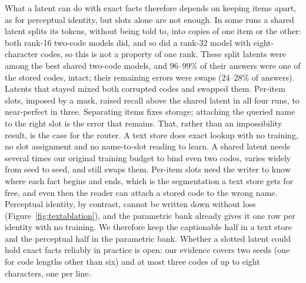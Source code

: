 What a latent can do with exact facts therefore depends on keeping items apart, as for perceptual identity, but slots alone are not enough. In some runs a shared latent splits its tokens, without being told to, into copies of one item or the other: both rank-16 two-code models did, and so did a rank-32 model with eight-character codes, so this is not a property of one rank. These split latents were among the best shared two-code models, and $96$--$99\%$ of their answers were one of the stored codes, intact; their remaining errors were swaps ($24$--$28\%$ of answers). Latents that stayed mixed both corrupted codes and swapped them. Per-item slots, imposed by a mask, raised recall above the shared latent in all four runs, to near-perfect in three. Separating items fixes storage; attaching the queried name to the right slot is the error that remains. That, rather than an impossibility result, is the case for the router. A text store does exact lookup with no training, no slot assignment and no name-to-slot reading to learn. A shared latent needs several times our original training budget to bind even two codes, varies widely from seed to seed, and still swaps them. Per-item slots need the writer to know where each fact begins and ends, which is the segmentation a text store gets for free, and even then the reader can attach a stored code to the wrong name. Perceptual identity, by contrast, cannot be written down without loss (Figure~\ref{fig:textablation}), and the parametric bank already gives it one row per identity with no training. We therefore keep the captionable half in a text store and the perceptual half in the parametric bank. Whether a slotted latent could hold exact facts reliably in practice is open: our evidence covers two seeds (one for code lengths other than six) and at most three codes of up to eight characters, one per line.


